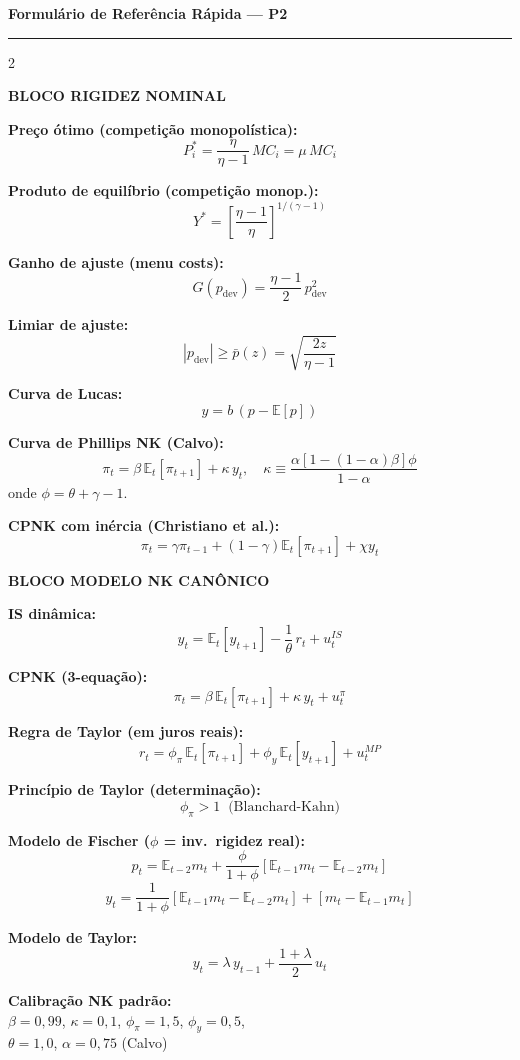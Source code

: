 \documentclass[12pt, a4paper]{article}
\newcommand{\E}{\mathbb{E}}
\begin{document}
\newpage
\thispagestyle{fancy}

\begin{center}
{\large\bfseries\color{cyanrbc} Formulário de Referência Rápida --- P2}\\[0.3em]
\rule{\linewidth}{0.6pt}
\end{center}

\vspace{0.3em}
\begin{multicols}{2}

\textbf{\textcolor{cyanrbc}{BLOCO RIGIDEZ NOMINAL}}

\medskip
\textbf{Preço ótimo (competição monopolística):}
\[
P_i^* = \frac{\eta}{\eta-1}\,MC_i = \mu\,MC_i
\]

\textbf{Produto de equilíbrio (competição monop.):}
\[
Y^* = \left[\frac{\eta-1}{\eta}\right]^{1/(\gamma-1)}
\]

\textbf{Ganho de ajuste (menu costs):}
\[
G(p_{\text{dev}}) = \frac{\eta-1}{2}\,p_{\text{dev}}^2
\]

\textbf{Limiar de ajuste:}
\[
|p_{\text{dev}}| \geq \bar{p}(z) = \sqrt{\frac{2z}{\eta-1}}
\]

\textbf{Curva de Lucas:}
\[
y = b\,(p - \E[p])
\]

\textbf{Curva de Phillips NK (Calvo):}
\[
\pi_t = \beta\,\E_t[\pi_{t+1}] + \kappa\,y_t,\quad
\kappa \equiv \frac{\alpha[1-(1-\alpha)\beta]\phi}{1-\alpha}
\]
onde $\phi = \theta + \gamma - 1$.

\textbf{CPNK com inércia (Christiano et al.):}
\[
\pi_t = \gamma\pi_{t-1} + (1-\gamma)\E_t[\pi_{t+1}] + \chi y_t
\]

\columnbreak

\textbf{\textcolor{cyanrbc}{BLOCO MODELO NK CANÔNICO}}

\medskip
\textbf{IS dinâmica:}
\[
y_t = \E_t[y_{t+1}] - \frac{1}{\theta}\,r_t + u_t^{IS}
\]

\textbf{CPNK (3-equação):}
\[
\pi_t = \beta\,\E_t[\pi_{t+1}] + \kappa\,y_t + u_t^{\pi}
\]

\textbf{Regra de Taylor (em juros reais):}
\[
r_t = \phi_\pi\,\E_t[\pi_{t+1}] + \phi_y\,\E_t[y_{t+1}] + u_t^{MP}
\]

\textbf{Princípio de Taylor (determinação):}
\[
\phi_\pi > 1 \;\;\text{(Blanchard-Kahn)}
\]

\textbf{Modelo de Fischer ($\phi$ = inv.\ rigidez real):}
\[
p_t = \E_{t-2}m_t + \frac{\phi}{1+\phi}[\E_{t-1}m_t - \E_{t-2}m_t]
\]
\[
y_t = \frac{1}{1+\phi}[\E_{t-1}m_t - \E_{t-2}m_t] + [m_t - \E_{t-1}m_t]
\]

\textbf{Modelo de Taylor:}
\[
y_t = \lambda\,y_{t-1} + \frac{1+\lambda}{2}\,u_t
\]

\textbf{Calibração NK padrão:}\\[2pt]
$\beta=0{,}99$, $\kappa=0{,}1$, $\phi_\pi=1{,}5$, $\phi_y=0{,}5$,\\
$\theta=1{,}0$, $\alpha=0{,}75$ (Calvo)

\end{multicols}
\end{document}
